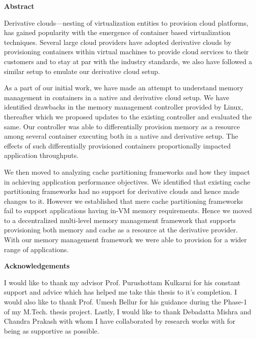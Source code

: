 \documentclass[11pt,a4paper]{report}
\begin{document}
  \begin{center}
    \huge \textbf{Abstract}
  \end{center}
  \vspace*{3em}
  \normalsize 
    
    Derivative clouds---nesting of virtualization entities to provision cloud platforms, has gained popularity 
    with the emergence of container based virtualization techniques. Several large cloud providers have adopted derivative 
    clouds by provisioning containers within virtual machines to provide cloud services to their 
    customers and to stay at par with the industry standards, we also have followed a similar setup to emulate our derivative 
    cloud setup.
    
    As a part of our initial work, we have made an attempt to understand memory management in containers in a native
    and derivative cloud setup. We have identified drawbacks in the memory management controller provided by Linux, thereafter which
    we proposed updates to the existing controller and evaluated the same. Our controller was able to differentially provision memory as
    a resource among several container executing both in a native and derivative setup. The effects of such differentially 
    provisioned containers proportionally impacted application throughputs.
    
    We then moved to analyzing cache partitioning frameworks and how they impact in achieving application performance 
    objectives. We identified that existing cache partitioning frameworks had no support for derivative clouds and
    hence made changes to it. However we established that mere cache partitioning frameworks fail to support applications 
    having in-VM memory requirements. Hence we moved to a decentralized multi-level memory management framework that
    supports provisioning both memory and cache as a resource at the derivative provider. With our memory 
    management framework we were able to provision for a wider range of applications.
    
    \newpage
    \begin{center}
      \huge \textbf{Acknowledgements}
    \end{center}
    \vspace*{3em}
    \normalsize 
    
    I would like to thank my advisor Prof. Purushottam Kulkarni for his constant support and advice which has helped me take 
    this thesis to it’s completion. I would also like to thank Prof. Umesh Bellur for his guidance during the Phase-1 of my 
    M.Tech. thesis project. Lastly, I would like to thank Debadatta Mishra and Chandra Prakash with whom I have collaborated by 
    research works with for being as supportive as possible.
    
\end{document}
